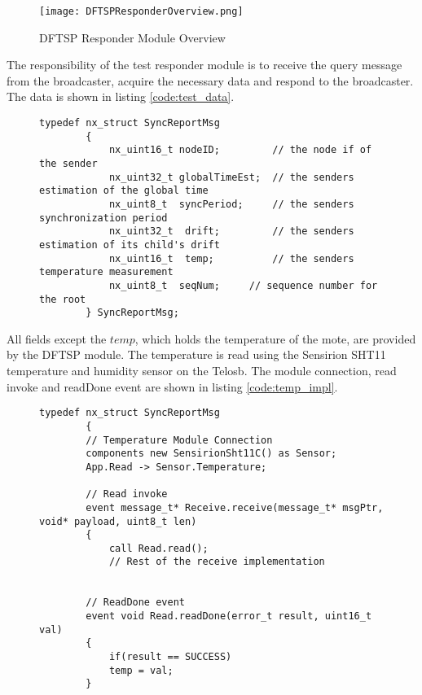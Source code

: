 \documentclass[Main]{subfiles}
\begin{document}
				\begin{figure}[H]
					\centering
					\texttt{[image: DFTSPResponderOverview.png]}
					\caption{DFTSP Responder Module Overview}
					\label{fig:DFTSPResponderOverview}
				\end{figure}

				The responsibility of the test responder module is to receive the query message from the broadcaster, acquire the necessary data and respond to the broadcaster.
				The data is shown in listing \ref{code:test_data}.

				\begin{figure}[H]
					\begin{lstlisting}[caption=DFTSP Test Data, style=Code-C, label=code:test_data]
		typedef nx_struct SyncReportMsg
		{
			nx_uint16_t	nodeID;			// the node if of the sender
			nx_uint32_t	globalTimeEst;	// the senders estimation of the global time
			nx_uint8_t  syncPeriod;		// the senders synchronization period
			nx_uint32_t  drift;			// the senders estimation of its child's drift
			nx_uint16_t  temp;			// the senders temperature measurement
			nx_uint8_t	seqNum;		// sequence number for the root
		} SyncReportMsg;

					\end{lstlisting}
				\end{figure}

				All fields except the $temp$, which holds the temperature of the mote, are provided by the DFTSP module.
				The temperature is read using the Sensirion SHT11\cite{tempSensorDatasheet} temperature and humidity sensor on the Telosb.
				The module connection, read invoke and readDone event are shown in listing \ref{code:temp_impl}.

				\begin{figure}[H]
					\begin{lstlisting}[caption=Temperature reading implementation, style=Code-C, label=code:temp_impl]
		typedef nx_struct SyncReportMsg
		{
		// Temperature Module Connection
		components new SensirionSht11C() as Sensor;
		App.Read -> Sensor.Temperature;

		// Read invoke
		event message_t* Receive.receive(message_t* msgPtr, void* payload, uint8_t len)
		{
	    	call Read.read();
	    	// Rest of the receive implementation


		// ReadDone event
		event void Read.readDone(error_t result, uint16_t val)
		{
			if(result == SUCCESS)
			temp = val;
		}

						\end{lstlisting}
				\end{figure}
		
\end{document}
